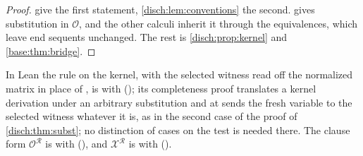\begin{proof}
 give the first
statement, \cref{disch:lem:conventions} the second.
 gives substitution in $\mathcal O$, and the other
calculi inherit it through the equivalences, which leave end sequents
unchanged. The rest is \cref{disch:prop:kernel} and
\cref{base:thm:bridge}.
\end{proof}

In Lean the rule on the kernel, with the selected witness read off the
normalized matrix in place of , is  with
 (); its completeness
proof translates a kernel derivation under an arbitrary substitution and
at  sends the fresh variable to the selected witness whatever
it is, as in the second case of the proof of \cref{disch:thm:subst}; no
distinction of cases on the test is needed there. The clause form
$\mathcal O^{\mathcal R}$ is  with 
(), and $\mathcal X^{\mathcal R}$ is 
with  ().

